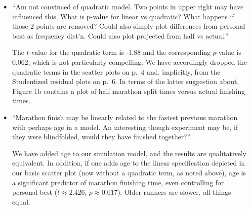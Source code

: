 \documentclass[12pt]{article}
\begin{document}
\begin{itemize}
\item ``Am not convinced of quadratic model. Two points in upper right
  may have influenced this. What is p-value for linear vs quadratic?
  What happens if those 2 points are removed? Could also simply plot
  differences from personal best as frequency dist'n. Could also plot
  projected from half vs actual.''

  The $t$-value for the quadratic term is -1.88 and the corresponding
  $p$-value is 0.062, which is not particularly compelling.  We have
  accordingly dropped the quadratic terms in the scatter plots on p.\
  4 and, implicitly, from the Studentized residual plots on p.\ 6.  In
  terms of the latter suggestion about, Figure 1b contains a plot of
  half marathon split times versus actual finishing times.
  
  
  
  
  
  
\item ``Marathon finish may be linearly related to the fastest
  previous marathon with perhaps age in a model. An interesting though
  experiment may be, if they were blindfolded, would they have
  finished together?''

  We have added age to our simulation model, and the results are
  qualitatively equivalent.  In addition, if one adds age to the
  linear specification depicted in our basic scatter plot (now without
  a quadratic term, as noted above), age is a significant predictor of
  marathon finishing time, even controlling for personal best
  ($t \approx 2.426$, $p \approx 0.017$).  Older runners are slower,
  all things equal.


\end{itemize}
\end{document}
